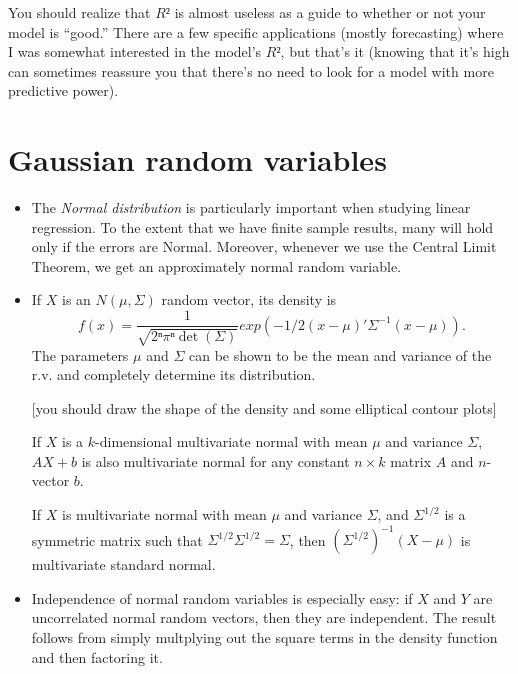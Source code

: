 \begin{itemize}
  You should realize that $R²$ is almost useless as a guide to whether
  or not your model is ``good.''  There are a few specific
  applications (mostly forecasting) where I was somewhat interested in
  the model's $R²$, but that's it (knowing that it's high can
  sometimes reassure you that there's no need to look for a model with
  more predictive power).

\end{itemize}

\section{Gaussian random variables}

\begin{itemize}

\item The \emph{Normal distribution} is particularly important when
  studying linear regression.  To the extent that we have finite
  sample results, many will hold only if the errors are Normal.
  Moreover, whenever we use the Central Limit Theorem, we get an
  approximately normal random variable.

\item If $X$ is an $N(μ, Σ)$ random vector, its density is
  \begin{equation*}
    f(x) = \frac{1}{\sqrt{2ⁿ πⁿ \det(Σ)}} exp(-1/2(x - μ)'Σ^{-1}(x- μ)).
  \end{equation*}
  The parameters $μ$ and $Σ$ can be shown to be the mean and variance
  of the r.v. and completely determine its distribution.

  [you should draw the shape of the density and some elliptical
  contour plots]

  If $X$ is a $k$-dimensional multivariate normal with mean $μ$
  and variance $Σ$, $A X + b$ is also multivariate normal for any
  constant $n × k$ matrix $A$ and $n$-vector $b$.

  If $X$ is multivariate normal with mean $μ$ and variance $Σ$,
  and $Σ^{1/2}$ is a symmetric matrix such that $Σ^{1/2} Σ^{1/2} = Σ$,
  then $(Σ^{1/2})^{-1} (X - μ)$ is multivariate standard normal.

\item Independence of normal random variables is especially easy: if
  $X$ and $Y$ are uncorrelated normal random vectors, then they are
  independent.  The result follows from simply multplying out the
  square terms in the density function and then factoring it.


\end{itemize}
